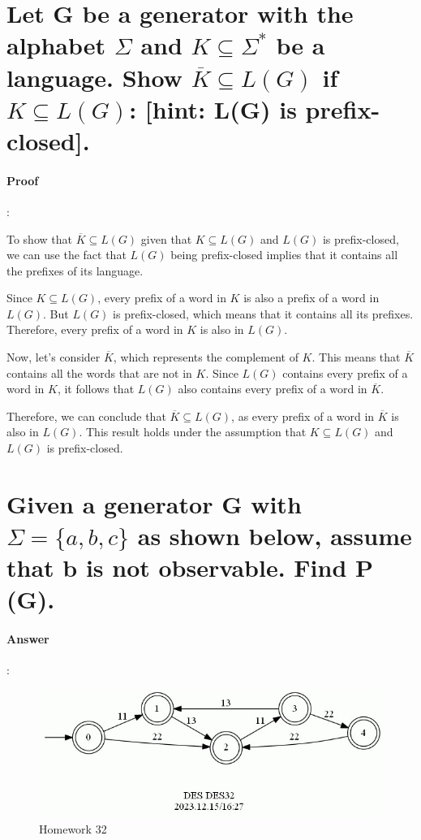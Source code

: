 \documentclass{article}
\begin{document}
\section{Let G be a generator with the alphabet $\Sigma$ and $K \subseteq \Sigma^*$ be a language. Show $\overline{K} \subseteq L(G)$ if $K \subseteq L(G)$: [hint: L(G) is prefix-closed].}

\paragraph{Proof}:

To show that $\overline{K} \subseteq L(G)$ given that $K \subseteq L(G)$ and $L(G)$ is prefix-closed, we can use the fact that $L(G)$ being prefix-closed implies that it contains all the prefixes of its language. 

Since $K \subseteq L(G)$, every prefix of a word in $K$ is also a prefix of a word in $L(G)$. But $L(G)$ is prefix-closed, which means that it contains all its prefixes. Therefore, every prefix of a word in $K$ is also in $L(G)$. 

Now, let's consider $\overline{K}$, which represents the complement of $K$. This means that $\overline{K}$ contains all the words that are not in $K$. Since $L(G)$ contains every prefix of a word in $K$, it follows that $L(G)$ also contains every prefix of a word in $\overline{K}$. 

Therefore, we can conclude that $\overline{K} \subseteq L(G)$, as every prefix of a word in $\overline{K}$ is also in $L(G)$. This result holds under the assumption that $K \subseteq L(G)$ and $L(G)$ is prefix-closed.



\section{Given a generator G with $\Sigma = \{a, b, c\}$ as shown below, assume that b is not observable. Find P (G).}

\paragraph{Answer}:

\begin{figure}[h!]
  \centering
  \includegraphics{assets/DES32.jpg}
  \caption{Homework 32}
  \label{fig:des32}
\end{figure}
\end{document}
